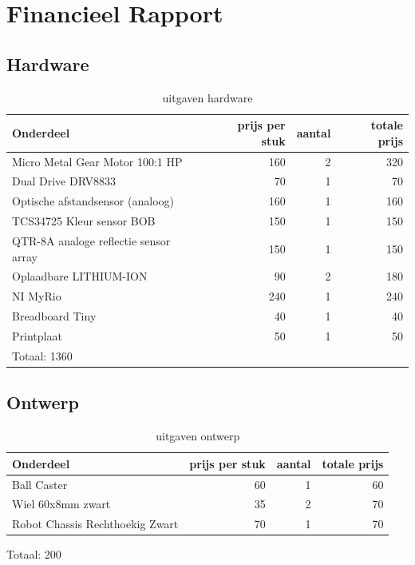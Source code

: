 \documentclass[a4paper,twoside,kulak]{kulakreport}
\begin{document}
\newpage
	\section{Financieel Rapport}
	\label{sec: finrap}
	\subsection*{Hardware}
	
	\begin{table}[h]
		
	
	\begin{tabular}{l|r|r|r}
		Onderdeel& prijs per stuk & aantal & totale prijs \\
		\hline
		Micro Metal Gear Motor 100:1 HP&160 & 2 & 320 \\ 
		
		Dual Drive DRV8833 & 70 & 1 & 70 \\
		Optische afstandsensor (analoog) & 160 & 1 & 160 \\
		TCS34725 Kleur sensor BOB & 150 & 1 & 150 \\
		QTR-8A analoge reflectie sensor array & 150 & 1 & 150 \\
		Oplaadbare LITHIUM-ION & 90 & 2 & 180 \\
		NI MyRio  & 240 & 1 & 240 \\
		Breadboard Tiny & 40 & 1 & 40 \\
		Printplaat & 50 & 1 & 50 \\
		Totaal: 1360
	\end{tabular}
\caption{uitgaven hardware}
\label{tab: ess}
\end{table}
	
	
	\subsection*{Ontwerp}
\begin{table}[h]	
	\begin{tabular}{l|r|r|r}
		
		Onderdeel& prijs per stuk & aantal & totale prijs \\
		\hline
		Ball Caster &60 & 1 & 60 \\
		Wiel 60x8mm zwart &35 & 2 & 70 \\
		Robot Chassis Rechthoekig Zwart &70 & 1 & 70 \\
		
	\end{tabular}
	

	Totaal: 200
	
\caption{uitgaven ontwerp}
\label{tab: ontw}
\end{table}
	
\end{document}
